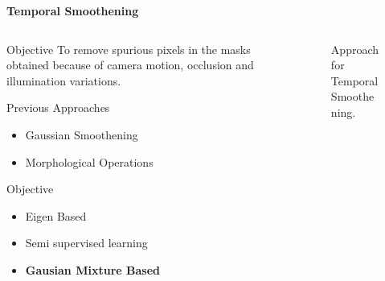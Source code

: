 \begin{frame}{\textbf{Temporal Smoothening}}
\begin{columns}
	\begin{column}{0.48\textwidth}
		\begin{varblock}[\textwidth]{Objective}
			To remove  spurious pixels in the masks obtained because of camera motion, occlusion and illumination variations.
		\end{varblock}
		\begin{varblock}[\textwidth]{Previous Approaches}
			\begin{itemize}
				\item Gaussian Smoothening
				\item Morphological Operations
			\end{itemize}
		\end{varblock}
		\begin{varblock}[\textwidth]{Objective}
				\begin{itemize}
				\item Eigen Based
				\item Semi supervised learning
				\item \textbf{\color{blue}Gausian Mixture Based}
			\end{itemize}	
		\end{varblock}
	\end{column}
	\begin{column}{0.48\textwidth}
	\begin{figure}
		\centering
		\caption{Approach for Temporal Smoothening.}
	\end{figure}
	\end{column}
\end{columns}
\end{frame}

